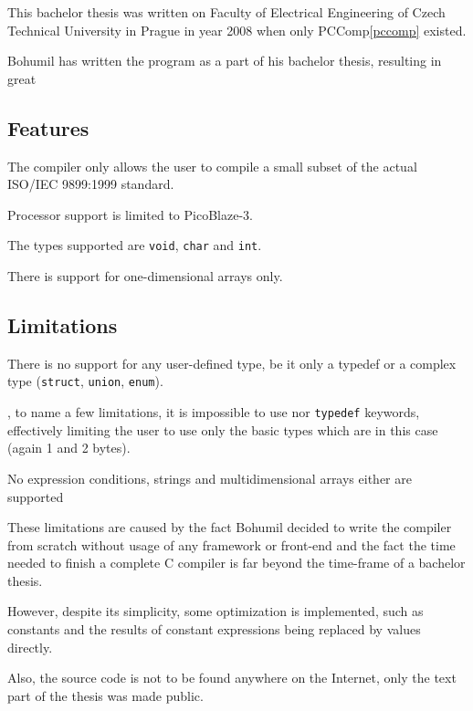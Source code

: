     This bachelor thesis was written on Faculty of Electrical Engineering of Czech Technical University in Prague in year 2008 when only PCComp\ref{pccomp} existed.

    Bohumil has written the program as a part of his bachelor thesis, resulting in great 

        \subsection{Features}

        The compiler only allows the user to compile a small subset of the actual ISO/IEC 9899:1999 standard.

        Processor support is limited to PicoBlaze-3.

        The types supported are \texttt{void}, \texttt{char} and \texttt{int}.

        There is support for one-dimensional arrays only.

        \subsection{Limitations}

        There is no support for any user-defined type, be it only a typedef or a complex type (\texttt{struct}, \texttt{union}, \texttt{enum}).

    ,
    to name a few limitations, it is impossible to use nor \texttt{typedef} keywords, effectively limiting the user to use only the basic types which are in this case  (again 1 and 2 bytes).

    No expression conditions, strings and multidimensional arrays either are supported

    These limitations are caused by the fact Bohumil decided to write the compiler
    from scratch without usage of any framework or front-end and the fact the time needed to finish a complete C compiler is far beyond the time-frame of a bachelor thesis.

    However, despite its simplicity, some optimization is implemented, 
    such as constants and the results of constant expressions being replaced by values directly.

    Also, the source code is not to be found anywhere on the Internet, only the text part of the thesis was made public.


